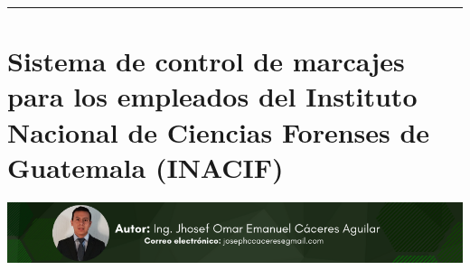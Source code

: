 \documentclass[12pt,spanish,Letterpaper,openany]{book}
\newcommand{\HRule}{\begin{center}\rule{0.5\linewidth}{0.2mm}\end{center}}
\begin{document}
\medskip

\HRule

\medskip

\hypertarget{article06}{%
\chapter{Sistema de control de marcajes para los empleados del Instituto Nacional de Ciencias Forenses de Guatemala (INACIF)}\label{article06}}

\begin{center}\includegraphics[width=1\linewidth]{images/omar} \end{center}
\end{document}
